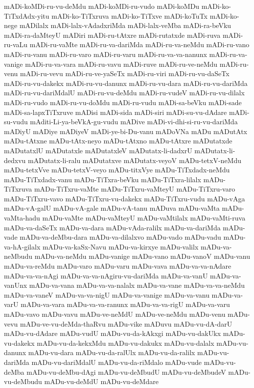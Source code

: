 {mADi-koMDi-ru-vu-deMdu
mADi-koMDi-ru-vudo
mADi-koMDu
mADi-ko-TiTxdAdx-yitu
mADi-ko-TiTxruva
mADi-ko-TiTxve
mADi-koTuTx
mADi-ko-nege
mADilalx
mADi-lalx-vAdadxriMda
mADi-lalx-veMba
mADi-ra-beVku
mADi-ra-daMteyU
mADiri
mADi-ru-tAtxre
mADi-rutatxde
mADi-ruva
mADi-ru-vaLu
mADi-ru-vaMte
mADi-ru-va-dariMda
mADi-ru-va-neMdu
mADi-ru-vano
mADi-ru-vanu
mADi-ru-varo
mADi-ru-varu
mADi-ru-va-va-nanunx
mADi-ru-va-vanige
mADi-ru-va-vara
mADi-ru-vavu
mADi-ruve
mADi-ru-ve-neMdu
mADi-ru-venu
mADi-ru-vevu
mADi-ru-ve-yaSeTx
mADi-ru-viri
mADi-ru-vu-daSeTx
mADi-ru-vu-dakekx
mADi-ru-vu-danunx
mADi-ru-vu-dara
mADi-ru-vu-dariMda
mADi-ru-vu-dariMdalU
mADi-ru-vu-deMdu
mADi-ru-vudeV
mADi-ru-vu-dilalx
mADi-ru-vudo
mADi-ru-vu-doMdu
mADi-ru-vudu
mADi-sa-beVku
mADi-sade
mADi-sa-lapxTiTxruve
mADisi
mADi-sida
mADi-siri
mADi-su-vu-dAdare
mADi-su-vudu
mAditi-Li-ya-beVkA-gu-vudu
mADive
mADi-vi-dhi-si-ru-vu-dariMda
mADiyU
mADiye
mADiyeV
mADi-ye-bi-Du-vanu
mADoVNa
mADu
mADutAtx
mADu-tAtxne
mADu-tAtx-neyo
mADu-tAtxno
mADu-tAtxre
mADutatxde
mADutatxlU
mADutatxle
mADutatxleV
mADutatx-li-dadxrU
mADutatx-li-dedxvu
mADutatx-li-ralu
mADutatxve
mADutatx-veyoV
mADu-tetxV-neMdu
mADu-tetxVve
mADu-tetxV-veyo
mADu-titxVye
mADu-TiTxdadx-neMdu
mADu-TiTxdadx-vanu
mADu-TiTxra-beVku
mADu-TiTxra-lilalx
mADu-TiTxruva
mADu-TiTxru-vaMte
mADu-TiTxru-vaMteyU
mADu-TiTxru-varo
mADu-TiTxru-vavo
mADu-TiTxru-vu-dakekx
mADu-TiTxru-vudu
mADu-vAga
mADu-vA-galU
mADu-vA-gale
mADu-vA-tanu
mADuva
mADu-vaMta
mADu-vaMta-hadu
mADu-vaMte
mADu-vaMteyU
mADu-vaMtilalx
mADu-vaMti-ruva
mADu-va-daSeTx
mADu-va-dara
mADu-vAda-ralilx
mADu-va-dariMda
mADu-vade
mADu-va-deMbu-dara
mADu-va-dilalxvo
mADu-vado
mADu-vadu
mADu-va-hA-gilalx
mADu-va-kaSx-Navu
mADu-va-kirxye
mADu-valilx
mADu-va-neMbudu
mADu-va-neMdu
mADu-vanige
mADu-vano
mADu-vanoV
mADu-vanu
mADu-va-reMdu
mADu-varo
mADu-varu
mADu-vava
mADu-va-va-nAdare
mADu-va-va-nAgi
mADu-va-va-nAgiru-vu-dariMda
mADu-va-vanU
mADu-va-vanUnx
mADu-va-vana
mADu-va-va-nalalx
mADu-va-vane
mADu-va-va-neMdu
mADu-va-vaneV
mADu-va-va-nigU
mADu-va-vanige
mADu-va-vanu
mADu-va-varU
mADu-va-vara
mADu-va-va-ranunx
mADu-va-va-rigU
mADu-va-varu
mADu-vavo
mADu-vavu
mADu-ve-neMdU
mADu-ve-neMdu
mADu-venu
mADu-vevu
mADu-ve-vu-deMda-thaRvu
mADu-vike
mADuvu
mADu-vu-dA-darU
mADu-vu-dAdare
mADu-vudU
mADu-vu-da-kAkxgi
mADu-vu-dakUkx
mADu-vu-dakekx
mADu-vu-da-kekxMdu
mADu-vu-dakukx
mADu-vu-dalalx
mADu-vu-danunx
mADu-vu-dara
mADu-vu-da-ralUlx
mADu-vu-da-ralilx
mADu-vu-dariMda
mADu-vu-dariMdalU
mADu-vu-da-riMdalo
mADu-vude
mADu-vu-deMba
mADu-vu-deMbu-dAgi
mADu-vu-deMbudU
mADu-vu-deMbudeV
mADu-vu-deMbudu
mADu-vu-deMdU
mADu-vu-deMdare
}
